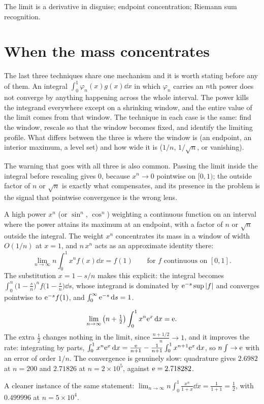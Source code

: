 \begin{seealsob}The limit is a derivative in disguise; endpoint concentration; Riemann sum recognition.\end{seealsob}

\section{When the mass concentrates}

The last three techniques share one mechanism and it is worth stating before any of them. An integral $\int_{0}^{1}\varphi_{n}(x)g(x)\dd x$ in which $\varphi_{n}$ carries an $n$th power does not converge by anything happening across the whole interval. The power kills the integrand everywhere except on a shrinking window, and the entire value of the limit comes from that window. The technique in each case is the same: find the window, rescale so that the window becomes fixed, and identify the limiting profile. What differs between the three is where the window is (an endpoint, an interior maximum, a level set) and how wide it is ($1/n$, $1/\sqrt n$, or vanishing).

The warning that goes with all three is also common. Passing the limit inside the integral before rescaling gives $0$, because $x^{n}\to0$ pointwise on $[0,1)$; the outside factor of $n$ or $\sqrt n$ is exactly what compensates, and its presence in the problem is the signal that pointwise convergence is the wrong lens.

\cue A high power $x^{n}$ (or $\sin^{n}$, $\cos^{n}$) weighting a continuous function on an interval where the power attains its maximum at an endpoint, with a factor of $n$ or $\sqrt n$ outside the integral.
\method The weight $x^{n}$ concentrates its mass in a window of width $O(1/n)$ at $x=1$, and $n\,x^{n}$ acts as an approximate identity there:
\[\lim_{n\to\infty}n\int_{0}^{1}x^{n}f(x)\dd x=f(1)\qquad\text{for }f\text{ continuous on }[0,1].\]
The substitution $x=1-s/n$ makes this explicit: the integral becomes $\int_{0}^{n}\bigl(1-\tfrac sn\bigr)^{n}f\bigl(1-\tfrac sn\bigr)\dd s$, whose integrand is dominated by $\mathrm{e}^{-s}\sup\left\lvert f\right\rvert$ and converges pointwise to $\mathrm{e}^{-s}f(1)$, and $\int_{0}^{\infty}\mathrm{e}^{-s}\,\mathrm{d} s=1$.

\begin{worked}
\[\lim_{n\to\infty}\left(n+\tfrac12\right)\int_{0}^{1}x^{n}\mathrm{e}^{x}\,\mathrm{d} x=\mathrm{e} .\]
The extra $\tfrac12$ changes nothing in the limit, since $\tfrac{n+1/2}{n}\to1$, and it improves the rate: integrating by parts, $\int_{0}^{1}x^{n}\mathrm{e}^{x}\,\mathrm{d} x=\tfrac{\mathrm{e}}{n+1}-\tfrac{1}{n+1}\int_{0}^{1}x^{n+1}\mathrm{e}^{x}\,\mathrm{d} x$, so $n\int\to\mathrm{e}$ with an error of order $1/n$. The convergence is genuinely slow: quadrature gives $2.6982$ at $n=200$ and $2.71826$ at $n=2\times10^{5}$, against $\mathrm{e}=2.718282$.

A cleaner instance of the same statement: $\displaystyle\lim_{n\to\infty}n\int_{0}^{1}\frac{x^{n}}{1+x}\dd x=\frac{1}{1+1}=\frac12$, with $0.499996$ at $n=5\times10^{4}$.
\end{worked}

